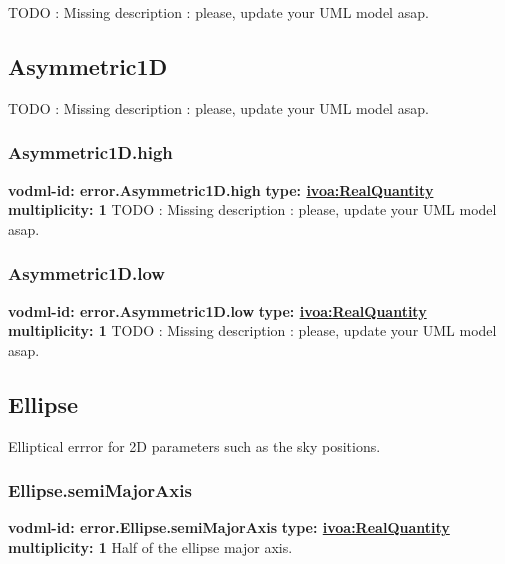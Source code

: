 
  TODO : Missing description : please, update your UML model asap.

  \subsection{Asymmetric1D}
  \label{sect:error.Asymmetric1D}
    TODO : Missing description : please, update your UML model asap.

    \subsubsection{Asymmetric1D.high}
      \textbf{vodml-id: error.Asymmetric1D.high} \newline
      \textbf{type: \hyperref[sect:ivoa]{ivoa:RealQuantity}} \newline
      \textbf{multiplicity: 1} \newline
      TODO : Missing description : please, update your UML model asap.

    \subsubsection{Asymmetric1D.low}
      \textbf{vodml-id: error.Asymmetric1D.low} \newline
      \textbf{type: \hyperref[sect:ivoa]{ivoa:RealQuantity}} \newline
      \textbf{multiplicity: 1} \newline
      TODO : Missing description : please, update your UML model asap.

  \subsection{Ellipse}
  \label{sect:error.Ellipse}
    Elliptical errror for 2D parameters such as the sky positions.

    \subsubsection{Ellipse.semiMajorAxis}
      \textbf{vodml-id: error.Ellipse.semiMajorAxis} \newline
      \textbf{type: \hyperref[sect:ivoa]{ivoa:RealQuantity}} \newline
      \textbf{multiplicity: 1} \newline
      Half of the ellipse major axis.


